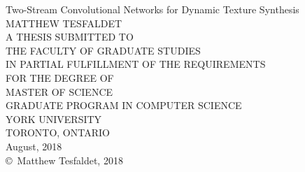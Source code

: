 \begin{titlepage}
	\thispagestyle{empty}
	\setcounter{page}{1}
	\centering
	{\LARGE Two-Stream Convolutional Networks for Dynamic Texture Synthesis\\}
	\vspace{4cm}
	\vspace{0.5cm}
	MATTHEW TESFALDET\\
	\vspace{2cm}
	A THESIS SUBMITTED TO\\
	THE FACULTY OF GRADUATE STUDIES\\
	IN PARTIAL FULFILLMENT OF THE REQUIREMENTS\\
	FOR THE DEGREE OF\\
	MASTER OF SCIENCE\\
	\vspace{1cm}
	GRADUATE PROGRAM IN COMPUTER SCIENCE\\
	YORK UNIVERSITY\\
	TORONTO, ONTARIO\\
	\vspace{1cm}
	August, 2018\\
	\vspace{1cm}
	\copyright \, Matthew Tesfaldet, 2018
\end{titlepage}